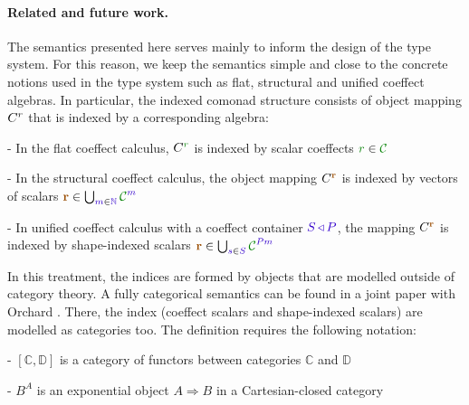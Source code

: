 \paragraph{Related and future work.}
The semantics presented here serves mainly to inform the design of the type system. For this 
reason, we keep the semantics simple and close to the concrete notions used in the type system
such as flat, structural and unified coeffect algebras. In particular, the indexed comonad 
structure consists of object mapping $C^{r}$ that is indexed by a corresponding algebra:

\begin{compactitem}
\item[-] In the flat coeffect calculus, $\ctyp{\cclrd{r}}{}$ is indexed by scalar coeffects $\cclrd{r} \in \C$
\item[-] In the structural coeffect calculus, the object mapping $\ctyp{\aclrd{\textbf{r}}}{}$ is 
  indexed by vectors of scalars $\aclrd{\textbf{r}} \in \bigcup_{\sclrd{m}\in \sclrd{\mathbb{N}}} \C^{\sclrd{m}}$
\item[-] In unified coeffect calculus with a coeffect container $\SH\,\sclrd{\triangleleft}\,\SP$,
  the mapping $\ctyp{\aclrd{\textbf{r}}}{}$ is indexed by shape-indexed scalars 
  $\aclrd{\textbf{r}} \in \bigcup_{\sclrd{s}\in \SH} \C^{\SP\sclrd{m}}$
\end{compactitem}

\noindent
In this treatment, the indices are formed by objects that are modelled outside of category theory.
A fully categorical semantics can be found in a joint paper with Orchard \cite{coeffects-icfp14}. 
There, the index (coeffect scalars and shape-indexed scalars) are modelled as categories too.
The definition requires the following notation:

\begin{compactitem}
\item[-] $[\mathbb{C}, \mathbb{D}]$ is a category of functors between categories $\mathbb{C}$ and $\mathbb{D}$
\item[-] $B^A$ is an exponential object $A \Rightarrow B$ in a Cartesian-closed category
\end{compactitem}

